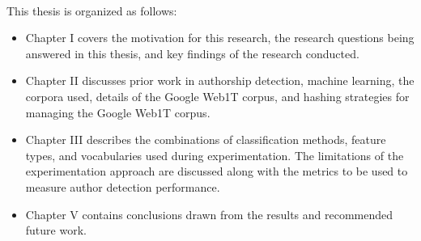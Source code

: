 \paragraph*{} This thesis is organized as follows:
\begin{itemize}
\item Chapter I covers the motivation for this research, the research questions being answered in this thesis, and key findings of the research conducted.
\item Chapter II discusses prior work in authorship detection, machine learning, the corpora used, details of the Google Web1T corpus, and hashing strategies for managing the Google Web1T corpus.
\item Chapter III describes the combinations of classification methods, feature types, and vocabularies used during experimentation.  The limitations of the experimentation approach are discussed along with the metrics to be used to measure author detection performance.
\item Chapter V contains conclusions drawn from the results and recommended future work.
\end{itemize}

